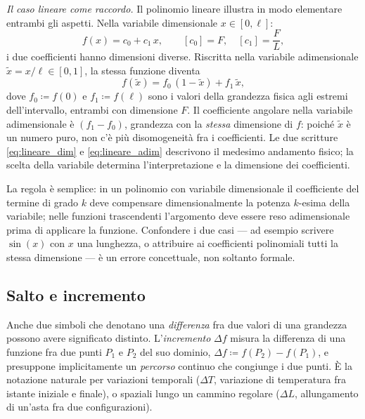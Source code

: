 \textit{Il caso lineare come raccordo.}
Il polinomio lineare illustra in modo elementare entrambi gli aspetti. Nella
variabile dimensionale $x \in [0, \ell]$:
\begin{equation}\label{eq:lineare_dim}
	f(x) = c_0 + c_1\,x, \qquad
	[c_0] = F, \quad [c_1] = \frac{F}{L},
\end{equation}
i due coefficienti hanno dimensioni diverse. Riscritta nella variabile
adimensionale $\tilde{x} = x/\ell \in [0,1]$, la stessa funzione diventa
\begin{equation}\label{eq:lineare_adim}
	f(\tilde{x}) = f_0\,(1 - \tilde{x}) + f_1\,\tilde{x},
\end{equation}
dove $f_0 \coloneqq f(0)$ e $f_1 \coloneqq f(\ell)$ sono i valori della
grandezza fisica agli estremi dell'intervallo, entrambi con dimensione
$F$. Il coefficiente angolare nella variabile adimensionale è
$(f_1 - f_0)$, grandezza con la \emph{stessa} dimensione di $f$: poiché
$\tilde{x}$ è un numero puro, non c'è più disomogeneità fra i coefficienti.
Le due scritture \eqref{eq:lineare_dim} e \eqref{eq:lineare_adim}
descrivono il medesimo andamento fisico; la scelta della variabile
determina l'interpretazione e la dimensione dei coefficienti.

\begin{oss}
	La regola è semplice: in un polinomio con variabile dimensionale il
	coefficiente del termine di grado $k$ deve compensare dimensionalmente
	la potenza $k$-esima della variabile; nelle funzioni trascendenti
	l'argomento deve essere reso adimensionale prima di applicare la
	funzione. Confondere i due casi --- ad esempio scrivere $\sin(x)$ con
	$x$ una lunghezza, o attribuire ai coefficienti polinomiali tutti la
	stessa dimensione --- è un errore concettuale, non soltanto formale.
\end{oss}

\subsection{Salto e incremento}\label{sec:salto_incremento}

Anche due simboli che denotano una \emph{differenza} fra due 
valori di una grandezza possono avere significato distinto. 
L'\textit{incremento} $\Delta f$ misura la differenza di una 
funzione fra due punti $P_1$ e $P_2$ del suo dominio, 
$\Delta f \coloneqq f(P_2) - f(P_1)$, e presuppone implicitamente un 
\emph{percorso} continuo che congiunge i due punti. È la 
notazione naturale per variazioni temporali ($\Delta T$, 
variazione di temperatura fra istante iniziale e finale), o 
spaziali lungo un cammino regolare ($\Delta L$, allungamento 
di un'asta fra due configurazioni). 


